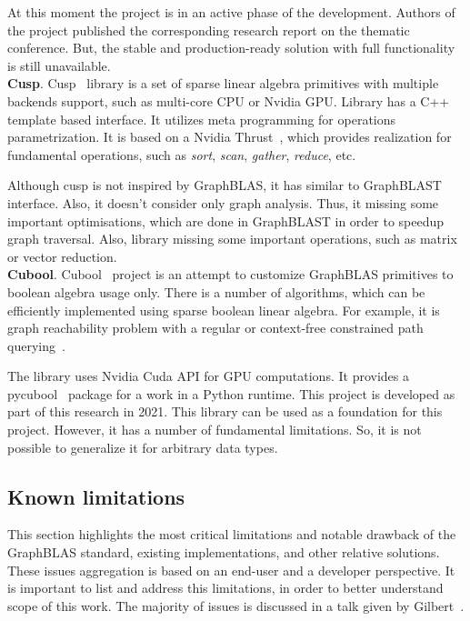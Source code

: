 At this moment the project is in an active phase of the development. Authors of the project published the corresponding research report on the thematic conference. But, the stable and production-ready solution with full functionality is still unavailable.\\

\textbf{Cusp}. Cusp~\cite{net:cusplibrary} library is a set of sparse linear algebra primitives with multiple backends support, such as multi-core CPU or Nvidia GPU. Library has a C++ template based interface. It utilizes meta programming for operations parametrization. It is based on a Nvidia Thrust~\cite{net:cuda_thrust}, which provides realization for fundamental operations, such as \textit{sort}, \textit{scan}, \textit{gather}, \textit{reduce}, etc.

Although cusp is not inspired by GraphBLAS, it has similar to GraphBLAST interface. Also, it doesn't consider only graph analysis. Thus, it missing some important optimisations, which are done in GraphBLAST in order to speedup graph traversal. Also, library missing some important operations, such as matrix or vector reduction.\\

\textbf{Cubool}. Cubool~\cite{net:cubool_project} project is an attempt to customize GraphBLAS primitives to boolean algebra usage only. There is a number of algorithms, which can be efficiently implemented using sparse boolean linear algebra. For example, it is graph reachability problem with a regular or context-free constrained path querying~\cite{inproceedings:cfpq_matrix_evaluation, inbook:kronecker_cfpq_adbis, inproceedings:matrix_cfpq, inproceedings:cfqp_matrix_with_single_source}.

The library uses Nvidia Cuda API for GPU computations. It provides a pycubool~\cite{net:pycubool} package for a work in a Python runtime. This project is developed as part of this research in 2021. This library can be used as a foundation for this project. However, it has a number of fundamental limitations. So, it is not possible to generalize it for arbitrary data types.

\subsection{Known limitations}

This section highlights the most critical limitations and notable drawback of the GraphBLAS standard, existing implementations, and other relative solutions. These issues aggregation is based on an end-user and a developer perspective. It is important to list and address this limitations, in order to better understand scope of this work. The majority of issues is discussed in a talk given by Gilbert~\cite{talk:graphblas_did_wrong}.

